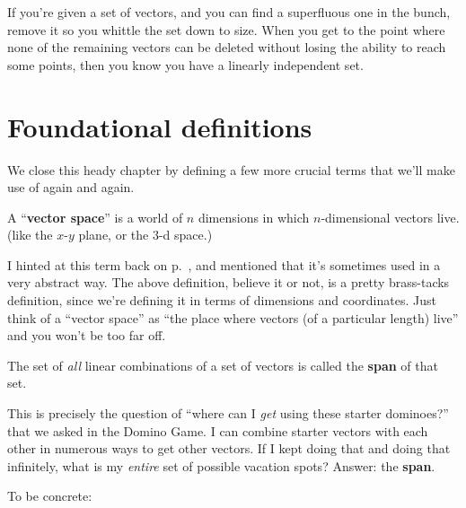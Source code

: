 If you're given a set of vectors, and you can find a superfluous one in the
bunch, remove it so you whittle the set down to size. When you get to the point
where none of the remaining vectors can be deleted without losing the ability
to reach some points, then you know you have a linearly independent set.

\section{Foundational definitions}

We close this heady chapter by defining a few more crucial terms that we'll
make use of again and again.


\begin{framed}
A ``\textbf{vector space}'' is a world of $n$ dimensions in which
$n$-dimensional vectors live. (like the $x$-$y$ plane, or the 3-d space.)
\end{framed}

I hinted at this term back on p.~\pageref{vectorSpace}, and mentioned that it's
sometimes used in a very abstract way. The above definition, believe it or not,
is a pretty brass-tacks definition, since we're defining it in terms of
dimensions and coordinates. Just think of a ``vector space'' as ``the place
where vectors (of a particular length) live'' and you won't be too far off.

\begin{framed}
The set of \textit{all} linear combinations of a set of vectors is called the
\textbf{span} of that set.
\end{framed}

This is precisely the question of ``where can I \textit{get} using these
starter dominoes?'' that we asked in the Domino Game. I can combine starter
vectors with each other in numerous ways to get other vectors. If I kept doing
that and doing that infinitely, what is my \textit{entire} set of possible
vacation spots? Answer: the \textbf{span}.

To be concrete:

